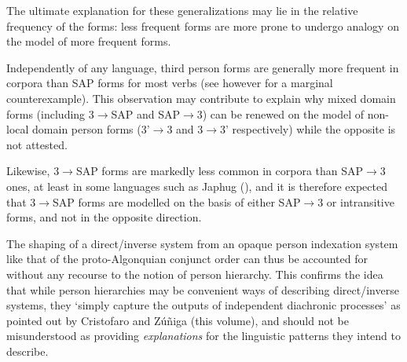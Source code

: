 \documentclass[twoside,a4paper,11pt]{article}
\newcommand{\Σ}{\greek{Σ}}
\begin{document}
The ultimate explanation for these generalizations may lie in the relative frequency of the forms: less frequent forms are more prone to undergo analogy on the model of more frequent forms. 

Independently of any language, third person forms are generally more frequent in corpora than SAP forms for most verbs (see however \citealt{jacques16ebde} for a marginal counterexample).  This observation may contribute to explain why mixed domain forms (including 3$\rightarrow$SAP and SAP$\rightarrow$3) can be renewed on the model of non-local domain person forms (3'$\rightarrow$3 and 3$\rightarrow$3' respectively) while the opposite is not attested.
 
Likewise, 3$\rightarrow$SAP forms are markedly less common in corpora than SAP$\rightarrow$3 ones, at least in some languages such as Japhug (\citealt{jacques10inverse}), and it is therefore expected that 3$\rightarrow$SAP forms are modelled on the basis of either SAP$\rightarrow$3 or intransitive forms, and not in the opposite direction.

 The shaping of a direct/inverse system from an opaque person indexation system like that of the proto-Algonquian conjunct order can thus be accounted for without any recourse to the notion of person hierarchy. This confirms the idea that while person hierarchies may be convenient ways of describing direct/inverse systems, they `simply capture the outputs of independent diachronic processes' as pointed out by Cristofaro and Zúñiga (this volume), and should not be misunderstood as providing \textit{explanations} for the linguistic patterns they intend to describe.

 
 
\end{document}
